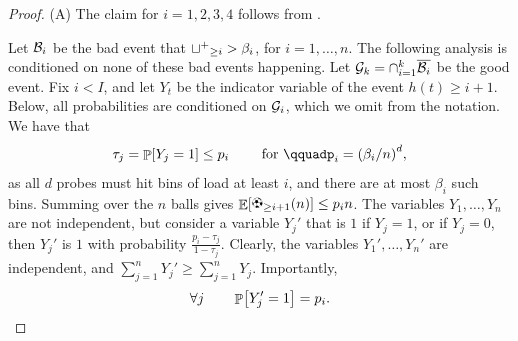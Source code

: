 \begin{proof}
    (A) The claim for $i=1,2,3,4$ follows from
    .

    Let $\mathcal{B}_i$ be the bad event that ${{\sqcup^+{}}_{\geq i}} > \beta_i$, for
    $i=1,\ldots, n$. The following analysis is conditioned on none of these
    bad events happening. Let
    $\mathcal{G}_k = {\cap_{i=1}^k \overline{\mathcal{B}_i}}$ be the good
    event.  Fix $i < I$, and let $Y_t$ be the indicator variable of the
    event $h(t) \geq i+1$. Below, all probabilities are conditioned on
    $\mathcal{G}_i$, which we omit from the notation. We have that
    \begin{equation*}
        \tau_j = \Prob{Y_j=1 } \leq p_i%
        \qquad\text{ for }\qquad%
        p_i=\pth{ \beta_i /n}^d,
    \end{equation*}
    as all $d$ probes must hit bins of load at least $i$, and there are
    at most $\beta_i$ such bins. Summing over the $n$ balls gives
    $\Ex{ \ballsY{i+1}{n} } \leq p_i n$.  The variables
    $Y_1, \ldots, Y_n$ are not independent, but consider a variable
    $Y_j'$ that is $1$ if $Y_j=1$, or if $Y_j=0$, then $Y_j'$ is $1$ with
    probability $\frac{p_i-\tau_j}{1-\tau_j}$. Clearly, the variables
    $Y_1',\ldots, Y_n'$ are independent, and
    $\sum_{j=1}^n Y_j' \geq \sum_{j=1}^n Y_j$. Importantly,
    \begin{equation*}
        \forall j
        \qquad
        \Prob{Y_j' =1}
        =
        p_i.
    \end{equation*}



\end{proof}
